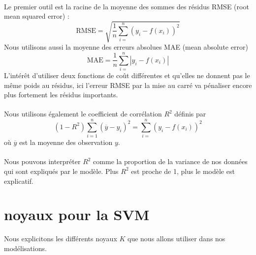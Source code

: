 \documentclass[a4paper,12pt,titlepage]{report}
\begin{document}
\paragraph{}
Le premier outil est la racine de la moyenne des sommes des résidus
RMSE (root mean squared error) : 
\[
\text{RMSE} = \sqrt{\frac{1}{n}\sum_{i=}^n {(y_i - f(x_i))^2}}
\] 
Nous utilisons aussi la moyenne des erreurs absolues MAE (mean absolute error)
\[
\text{MAE} = \frac{1}{n}\sum_{i=}^n {|y_i - f(x_i)|}
\] 
L'intérêt d'utiliser deux fonctions de coût différentes et qu'elles ne donnent pas le même poids au résidus, ici l'erreur RMSE par la mise au carré va pénaliser encore plus fortement les résidus importants.

\paragraph{}
Nous utilisons également le coefficient de corrélation $R^2$
définis par 
\[ (1 - R^2) \sum_{i=1}^n {(\overline{y} - y_i)^2} = \sum_{i=}^n {(y_i - f(x_i))^2} \]
où $\overline{y}$ est la moyenne des observation $y$.

\paragraph{}
Nous pouvons interpréter $R^2$ comme la proportion de la variance de nos données qui sont expliqués par le modèle. Plus $R^2$ est proche de 1, plus le modèle est explicatif.






\section{noyaux pour la SVM}
\paragraph{}
Nous explicitons les différents noyaux $K$ que nous allons utiliser dans nos modélisations.\\
\end{document}
